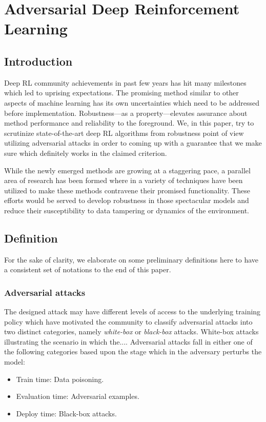\documentclass[a4paper,12pt]{article}
\begin{document}

\section{Adversarial Deep Reinforcement Learning}

\subsection{Introduction}
Deep RL community achievements in past few years has hit many milestones which led to uprising expectations. The promising method similar to other aspects of machine learning has its own uncertainties which need to be addressed before implementation. Robustness---as a property---elevates assurance about method performance and reliability to the foreground. We, in this paper, try to scrutinize state-of-the-art deep RL algorithms from robustness point of view utilizing adversarial attacks in order to coming up with a guarantee that we make sure which definitely works in the claimed criterion.

While the newly emerged methods are growing at a staggering pace, a parallel area of research has been formed where in a variety of techniques have been utilized to make these methods contravene their promised functionality. These efforts would be served to develop robustness in those spectacular models and reduce their susceptibility to data tampering or dynamics of the environment.

\subsection{Definition}
For the sake of clarity, we elaborate on some preliminary definitions here to have a consistent set of notations to the end of this paper.

\subsubsection{Adversarial attacks}
The designed attack may have different levels of access to the underlying training policy which have motivated the community to classify adversarial attacks into two distinct categories, namely \textit{white-box} or \textit{black-box} attacks. White-box attacks illustrating the scenario in which the.... Adversarial attacks fall in either one of the following categories based upon the stage which in the adversary perturbs the model:
\begin{itemize}
    \item Train time: Data poisoning.
    \item Evaluation time: Adversarial examples.
    \item Deploy time: Black-box attacks.
\end{itemize}
\end{document}
